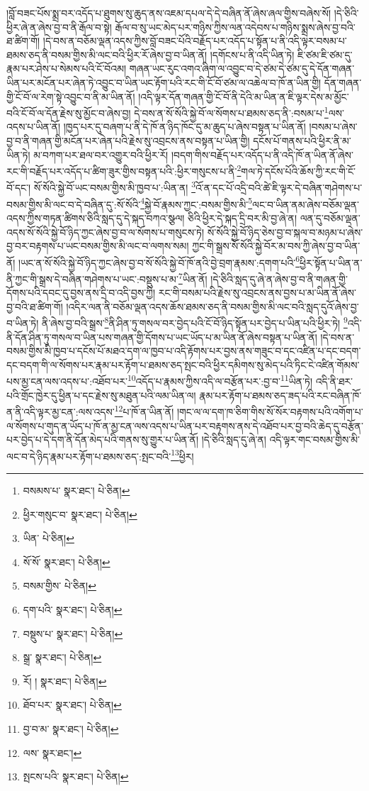 །བློ་བཟང་པོས་སྨྲ་བར་འདོད་པ་ཐུགས་སུ་ཆུད་ནས་འཇམ་དཔལ་དེ་དེ་བཞིན་ནོ་ཞེས་ཞལ་གྱིས་བཞེས་སོ། །དེ་ཅིའི་ཕྱིར་ཞེ་ན་ཞེས་བྱ་བ་ནི་རྒོལ་བ་སྟེ། རྒོལ་བ་སུ་ཡང་མེད་པར་གཉིས་ཀྱིས་ལན་འདེབས་པ་གཉིས་སྨྲས་ཞེས་བྱ་བའི་ཐ་ཚིག་གོ། །དེ་བས་ན་བཅོམ་ལྡན་འདས་ཀྱིས་བློ་བཟང་པོའི་བརྗོད་པར་འདོད་པ་སྟོན་པ་ནི་འདི་ལྟར་བསམ་པ་ཐམས་ཅད་ནི་བསམ་གྱིས་མི་ལང་བའི་ཕྱིར་རོ་ཞེས་བྱ་བ་ཡིན་ནོ། །དགོངས་པ་ནི་འདི་ཡིན་ཏེ། ཇི་ཙམ་ཇི་ཙམ་དུ་རྣམ་པར་ཤེས་པ་སེམས་པའི་ངོ་བོའམ། གཞན་ཡང་རུང་འགའ་ཞིག་ལ་འབྱུང་བ་དེ་ཙམ་དེ་ཙམ་དུ་དེ་དོན་གཞན་ཡིན་པར་མངོན་པར་ཞེན་ཏེ་འབྱུང་བ་ཡིན་ཡང་རྟོག་པའི་རང་གི་ངོ་བོ་ཙམ་ལ་འཆེལ་བ་ཁོ་ན་ཡིན་གྱི། དོན་གཞན་གྱི་ངོ་བོ་ལ་རེག་སྟེ་འབྱུང་བ་ནི་མ་ཡིན་ནོ། །འདི་ལྟར་དོན་གཞན་གྱི་ངོ་བོ་ནི་དེའི་མ་ཡིན་ན་ཇི་ལྟར་དེས་མ་མྱོང་བའི་ངོ་བོ་ལ་དོན་རྗེས་སུ་མྱོང་བ་ཞེས་བྱ། དེ་བས་ན་སོ་སོའི་སྐྱེ་བོ་ལ་སོགས་པ་ཐམས་ཅད་ནི་:བསམ་པ་\footnote{བསམས་པ་  སྣར་ཐང་།  པེ་ཅིན། }ལས་འདས་པ་ཡིན་ནོ། །ཁྱད་པར་དུ་བཞག་པ་ནི་དེ་ཁོ་ན་ཉིད་ཁོང་དུ་མ་ཆུད་པ་ཞེས་བསྟན་པ་ཡིན་ནོ། །བསམ་པ་ཞེས་བྱ་བ་ནི་གཞན་གྱི་མངོན་པར་ཞེན་པའི་རྗེས་སུ་འབྲངས་ནས་བསྟན་པ་ཡིན་གྱི། དངོས་པོ་གནས་པའི་ཕྱིར་ནི་མ་ཡིན་ཏེ། མ་བཀག་པར་ཐལ་བར་འགྱུར་བའི་ཕྱིར་རོ། །བདག་གིས་བརྗོད་པར་འདོད་པ་ནི་འདི་ཁོ་ན་ཡིན་ནོ་ཞེས་རང་གི་བརྗོད་པར་འདོད་པ་ཚིག་ཟུར་གྱིས་བསྟན་པའི་:ཕྱིར་གསུངས་པ་ནི་\footnote{ཕྱིར་གསུང་བ་  སྣར་ཐང་།  པེ་ཅིན། }གལ་ཏེ་དངོས་པོའི་ཆོས་ཀྱི་རང་གི་ངོ་བོ་དང་། སོ་སོའི་སྐྱེ་བོ་ཡང་བསམ་གྱིས་མི་ཁྱབ་པ་:ཡིན་ན། \footnote{ཡིན་  པེ་ཅིན། }འོ་ན་དང་པོ་འདྲི་བའི་ཚེ་ཇི་ལྟར་དེ་བཞིན་གཤེགས་པ་བསམ་གྱིས་མི་ལང་བ་དེ་བཞིན་དུ་:སོ་སོའི་\footnote{སོ་སོ་  སྣར་ཐང་།  པེ་ཅིན། }སྐྱེ་བོ་རྣམས་ཀྱང་:བསམ་གྱིས་མི་\footnote{བསམ་གྱིས་  པེ་ཅིན། }ལང་བ་ཡིན་ནམ་ཞེས་བཅོམ་ལྡན་འདས་ཀྱིས་གཏན་ཚིགས་ཅིའི་སླད་དུ་དེ་སྐད་བཀའ་སྩལ། ཅིའི་ཕྱིར་དེ་སྐད་དྲི་བར་མི་བྱ་ཞེ་ན། ལན་དུ་བཅོམ་ལྡན་འདས་སོ་སོའི་སྐྱེ་བོ་ཉིད་ཀྱང་ཞེས་བྱ་བ་ལ་སོགས་པ་གསུངས་ཏེ། སོ་སོའི་སྐྱེ་བོ་ཉིད་ཅེས་བྱ་བ་སྐལ་བ་མཉམ་པ་ཞེས་བྱ་བར་བརྟགས་པ་ཡང་བསམ་གྱིས་མི་ལང་བ་ལགས་སམ། ཀྱང་གི་སྒྲས་སོ་སོའི་སྐྱེ་བོར་མ་བས་ཀྱི་ཞེས་བྱ་བ་ཡིན་ནོ། །ཡང་ན་སོ་སོའི་སྐྱེ་བོ་ཉིད་ཀྱང་ཞེས་བྱ་བ་སོ་སོའི་སྐྱེ་བོ་ཁོ་ནའི་བྱེ་བྲག་རྣམས་:དགག་པའི་\footnote{དག་པའི་  སྣར་ཐང་།  པེ་ཅིན། }ཕྱིར་སྟོན་པ་ཡིན་ན་ནི་ཀྱང་གི་སྒྲས་དེ་བཞིན་གཤེགས་པ་ཡང་:བསྡུས་པ་མ་\footnote{བསྡུས་པ་  སྣར་ཐང་།  པེ་ཅིན། }ཡིན་ནོ། །དེ་ཅིའི་སླད་དུ་ཞེ་ན་ཞེས་བྱ་བ་ནི་གཞན་གྱི་དོགས་པའི་དབང་དུ་བྱས་ནས་དྲི་བ་འདི་བྱས་ཀྱི། རང་གི་བསམ་པའི་རྗེས་སུ་འབྲངས་ནས་བྱས་པ་མ་ཡིན་ནོ་ཞེས་བྱ་བའི་ཐ་ཚིག་གོ། །འདིར་ལན་ནི་བཅོམ་ལྡན་འདས་ཆོས་ཐམས་ཅད་ནི་བསམ་གྱིས་མི་ལང་བའི་སླད་དུའོ་ཞེས་བྱ་བ་ཡིན་ཏེ། ནི་ཞེས་བྱ་བའི་སྒྲས་\footnote{སྒྲ་  སྣར་ཐང་།  པེ་ཅིན། }ནི་ཤིན་ཏུ་གསལ་བར་བྱེད་པའི་ངོ་བོ་ཉིད་སྟོན་པར་བྱེད་པ་ཡིན་པའི་ཕྱིར་ཏེ། \footnote{རོ། །   སྣར་ཐང་།  པེ་ཅིན། }འདི་ནི་དོན་ཤིན་ཏུ་གསལ་བ་ཡིན་པས་གཞན་གྱི་དོགས་པ་ཡང་ཡོད་པ་མ་ཡིན་ནོ་ཞེས་བསྟན་པ་ཡིན་ནོ། །དེ་བས་ན་བསམ་གྱིས་མི་ཁྱབ་པ་དངོས་པོ་མཐའ་དག་ལ་ཁྱབ་པ་འདི་རྟོགས་པར་བྱས་ནས་གཟུང་བ་དང་འཛིན་པ་དང་བདག་དང་བདག་གི་ལ་སོགས་པར་རྣམ་པར་རྟོག་པ་ཐམས་ཅད་སྤང་བའི་ཕྱིར་དམིགས་སུ་མེད་པའི་ཏིང་ངེ་འཛིན་གོམས་པས་མྱ་ངན་ལས་འདས་པ་:འཐོབ་པར་\footnote{ཐོབ་པར་  སྣར་ཐང་།  པེ་ཅིན། }འདོད་པ་རྣམས་ཀྱིས་འདི་ལ་བརྩོན་པར་:བྱ་བ་\footnote{བྱ་བ་མ་  སྣར་ཐང་།  པེ་ཅིན། }ཡིན་ཏེ། འདི་ནི་ཐར་པའི་གྲོང་ཁྱེར་དུ་ཕྱིན་པ་དང་རྗེས་སུ་མཐུན་པའི་ལམ་ཡིན་ལ། རྣམ་པར་རྟོག་པ་ཐམས་ཅད་ཟད་པའི་རང་བཞིན་ཁོ་ན་ནི་འདི་ལྟར་མྱ་ངན་:ལས་འདས་\footnote{ལས་  སྣར་ཐང་། }པ་ཁོ་ན་ཡིན་ནོ། །གང་ལ་ལ་དག་ཁ་ཅིག་གིས་སོ་སོར་བརྟགས་པའི་འགོག་པ་ལ་སོགས་པ་གུད་ན་ཡོད་པ་ཁོ་ན་མྱ་ངན་ལས་འདས་པ་ཡིན་པར་བརྟགས་ནས་དེ་འཐོབ་པར་བྱ་བའི་ཆེད་དུ་བརྩོན་པར་བྱེད་པ་དེ་དག་ནི་དོན་མེད་པའི་གནས་སུ་གྱུར་པ་ཡིན་ནོ། །དེ་ཅིའི་སླད་དུ་ཞེ་ན། འདི་ལྟར་གང་བསམ་གྱིས་མི་ལང་བ་དེ་ཉིད་རྣམ་པར་རྟོག་པ་ཐམས་ཅད་:སྤང་བའི་\footnote{སྤངས་པའི་  སྣར་ཐང་།  པེ་ཅིན། }ཕྱིར། 
